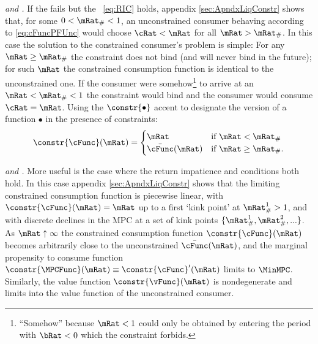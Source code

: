 \documentclass[BufferStockTheory]{subfiles}
\begin{document}
\textit{\cncl{\GICAbs} and {\RIC}.}  If the {\GICAbs} fails but the \RIC~\eqref{eq:RIC} holds, appendix \ref{sec:ApndxLiqConstr} shows that, for some $0 < \mRat_{\#} < 1$, an unconstrained consumer behaving according to
\eqref{eq:cFuncPFUnc} would choose $\cRat < \mRat$ for all $\mRat >
\mRat_{\#}$.  In this case the solution to the constrained consumer's problem is simple: For any $\mRat
\geq \mRat_{\#}$ the constraint does not bind (and will never bind in
the future); for such $\mRat$ the constrained consumption function is identical
to the unconstrained one.  If the consumer were somehow\footnote{``Somehow'' because $\mRat<1$ could only be obtained by entering the period with $\bRat < 0$ which the constraint forbids.}
to arrive at an $\mRat < \mRat_{\#} < 1$ the constraint would bind and
the consumer would consume $\cRat=\mRat$.  Using the $\constr{\bullet}$ accent to designate the version of a function $\bullet$ in the presence of constraints:
\begin{equation}
  \constr{\cFunc}(\mRat)=
  \begin{cases}
    \mRat & \text{if $\mRat < \mRat_{\#}$} \\
    \bar{\cFunc}(\mRat)  & \text{if $\mRat \geq \mRat_{\#}$.}
  \end{cases}
\end{equation}

\textit{{\GICAbs} and {\RIC}.}  More useful is the case where the return impatience and {\GIC} conditions both hold.  In this case appendix \ref{sec:ApndxLiqConstr} shows that the limiting constrained consumption function is piecewise linear, with $\constr{\cFunc}(\mRat)=\mRat$ up to a first `kink point' at $\mRat_{\#}^{1}>1$, and with discrete declines in the MPC at a set of kink points $\{\mRat_{\#}^{1},\mRat_{\#}^{2},...\}$.  As $\mRat \uparrow \infty$ the constrained consumption function $\constr{\cFunc}(\mRat)$ becomes arbitrarily close to the unconstrained $\bar{\cFunc}(\mRat)$, and the marginal propensity to consume function $\constr{\MPCFunc}(\mRat) \equiv \constr{\cFunc}^{\prime}(\mRat)$ limits to $\MinMPC$.  Similarly, the value function $\constr{\vFunc}(\mRat)$ is nondegenerate and limits into the value function of the unconstrained consumer.
\end{document}
